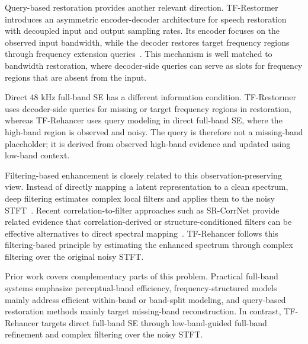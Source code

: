 Query-based restoration provides another relevant direction. TF-Restormer introduces an asymmetric encoder-decoder architecture for speech restoration with decoupled input and output sampling rates. Its encoder focuses on the observed input bandwidth, while the decoder restores target frequency regions through frequency extension queries~\cite{shin2026tfre}. This mechanism is well matched to bandwidth restoration, where decoder-side queries can serve as slots for frequency regions that are absent from the input.

Direct 48 kHz full-band SE has a different information condition. TF-Restormer uses decoder-side queries for missing or target frequency regions in restoration, whereas TF-Rehancer uses query modeling in direct full-band SE, where the high-band region is observed and noisy. The query is therefore not a missing-band placeholder; it is derived from observed high-band evidence and updated using low-band context.

Filtering-based enhancement is closely related to this observation-preserving view. Instead of directly mapping a latent representation to a clean spectrum, deep filtering estimates complex local filters and applies them to the noisy STFT~\cite{schroter2022deepfilternet2}. Recent correlation-to-filter approaches such as SR-CorrNet provide related evidence that correlation-derived or structure-conditioned filters can be effective alternatives to direct spectral mapping~\cite{shin2026srcorrnet}. TF-Rehancer follows this filtering-based principle by estimating the enhanced spectrum through complex filtering over the original noisy STFT.

Prior work covers complementary parts of this problem. Practical full-band systems emphasize perceptual-band efficiency, frequency-structured models mainly address efficient within-band or band-split modeling, and query-based restoration methods mainly target missing-band reconstruction. In contrast, TF-Rehancer targets direct full-band SE through low-band-guided full-band refinement and complex filtering over the noisy STFT.
